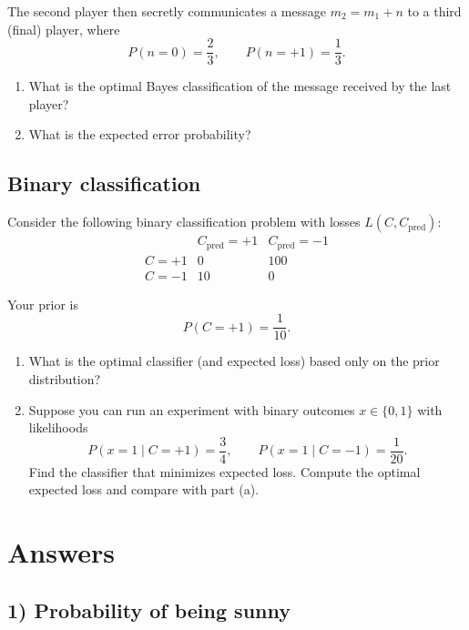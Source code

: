 \documentclass[14pt]{extarticle}
\begin{document}
The second player then secretly communicates a message
\( m_2 = m_1 + n \)
to a third (final) player, where
\[
P(n=0)=\frac{2}{3},
\qquad
P(n=+1)=\frac{1}{3}.
\]

\begin{enumerate}
\item What is the optimal Bayes classification of the message received by the last player?
\item What is the expected error probability?
\end{enumerate}

\subsection{Binary classification}
Consider the following binary classification problem with losses
\( L(C, C_{\mathrm{pred}}) \):
\[
\begin{array}{c|cc}
       & C_{\mathrm{pred}} = +1 & C_{\mathrm{pred}} = -1 \\
\hline
C = +1 & 0   & 100 \\
C = -1 & 10  & 0
\end{array}
\]

Your prior is
\[
P(C=+1)=\frac{1}{10}.
\]

\begin{enumerate}
\item What is the optimal classifier (and expected loss) based only on the prior distribution?
\item Suppose you can run an experiment with binary outcomes
\( x \in \{0,1\} \)
with likelihoods
\[
P(x = 1 \mid C = +1) = \frac{3}{4},
\qquad
P(x = 1 \mid C = -1) = \frac{1}{20}.
\]
Find the classifier that minimizes expected loss.
Compute the optimal expected loss and compare with part (a).
\end{enumerate}

\newpage

\section*{Answers}

\subsection*{1) Probability of being sunny}
\end{document}
